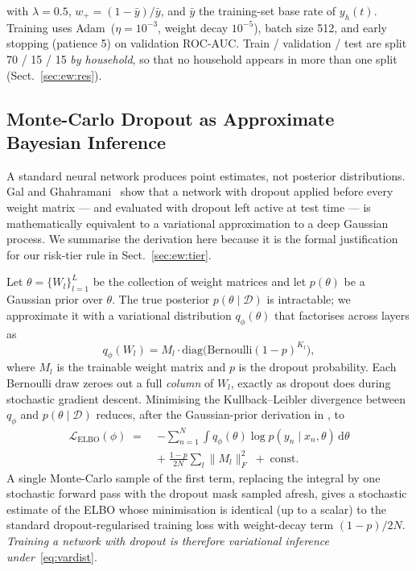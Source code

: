 \documentclass[colorlinks,balance]{asmeconf}
\begin{document}
with $\lambda \!=\! 0.5$, $w_+ \!=\! (1\!-\!\bar y)/\bar y$, and $\bar y$ the training-set base rate of $y_h(t)$. Training uses Adam~($\eta\!=\!10^{-3}$, weight decay $10^{-5}$), batch size 512, and early stopping (patience 5) on validation ROC-AUC. Train / validation / test are split 70 / 15 / 15 \emph{by household}, so that no household appears in more than one split (Sect.~\ref{sec:ew:res}).

\subsection{Monte-Carlo Dropout as Approximate Bayesian Inference}\label{sec:ew:mcd}
A standard neural network produces point estimates, not posterior distributions. Gal and Ghahramani~\cite{gal2016dropout} show that a network with dropout applied before every weight matrix --- and evaluated with dropout left active at test time --- is mathematically equivalent to a variational approximation to a deep Gaussian process. We summarise the derivation here because it is the formal justification for our risk-tier rule in Sect.~\ref{sec:ew:tier}.

Let $\theta = \{W_l\}_{l=1}^L$ be the collection of weight matrices and let $p(\theta)$ be a Gaussian prior over $\theta$. The true posterior $p(\theta \mid \mathcal{D})$ is intractable; we approximate it with a variational distribution $q_\phi(\theta)$ that factorises across layers as
\begin{equation}\label{eq:vardist}
q_\phi(W_l) = M_l \cdot \mathrm{diag}\!\big(\mathrm{Bernoulli}(1-p)^{K_l}\big),
\end{equation}
where $M_l$ is the trainable weight matrix and $p$ is the dropout probability. Each Bernoulli draw zeroes out a full \emph{column} of $W_l$, exactly as dropout does during stochastic gradient descent. Minimising the Kullback--Leibler divergence between $q_\phi$ and $p(\theta \mid \mathcal{D})$ reduces, after the Gaussian-prior derivation in \cite{gal2016dropout}, to
\begin{equation}\label{eq:elbo}
\begin{aligned}
\mathcal{L}_{\mathrm{ELBO}}(\phi) \;=\;& - \sum_{n=1}^N \int q_\phi(\theta) \log p(y_n \mid x_n, \theta)\, \mathrm{d}\theta \\
&+\; \frac{1-p}{2N} \sum_l \|M_l\|_F^2 \;+\; \mathrm{const.}
\end{aligned}
\end{equation}
A single Monte-Carlo sample of the first term, replacing the integral by one stochastic forward pass with the dropout mask sampled afresh, gives a stochastic estimate of the ELBO whose minimisation is identical (up to a scalar) to the standard dropout-regularised training loss with weight-decay term $(1-p)/2N$. \emph{Training a network with dropout is therefore variational inference under}~\eqref{eq:vardist}.
\end{document}
